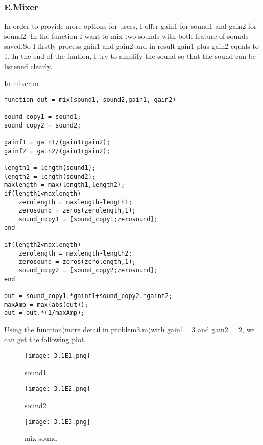 \documentclass{article}
\begin{document}
\subsubsection*{E.Mixer}
In order to provide more options for users,
I offer gain1 for sound1 and gain2 for sound2.
In the function I want to mix two sounds with 
both feature of sounds saved.So I firstly process 
gain1 and gain2 and in result gain1 plus gain2 equals to 1. 
In the end of the funtion, I try to amplify the sound 
so that the sound can be listened clearly.\par
In mixer.m\par
\begin{lstlisting} 
function out = mix(sound1, sound2,gain1, gain2)

sound_copy1 = sound1;
sound_copy2 = sound2;

gainf1 = gain1/(gain1+gain2);
gainf2 = gain2/(gain1+gain2);

length1 = length(sound1);
length2 = length(sound2);
maxlength = max(length1,length2);
if(length1<maxlength)
    zerolength = maxlength-length1;
    zerosound = zeros(zerolength,1);
    sound_copy1 = [sound_copy1;zerosound];
end

if(length2<maxlength)
    zerolength = maxlength-length2;
    zerosound = zeros(zerolength,1);
    sound_copy2 = [sound_copy2;zerosound];
end

out = sound_copy1.*gainf1+sound_copy2.*gainf2;
maxAmp = max(abs(out));
out = out.*(1/maxAmp);
\end{lstlisting}
\newpage
Using the function(more detail in problem3.m)with gain1 =3 and gain2 = 2,
we can get the following plot.\par
\begin{figure}[h]
    \begin{minipage}{1.0\textwidth}
        \centering
        \texttt{[image: 3.1E1.png]}
        \caption{sound1}
    \end{minipage}

    \quad

    \begin{minipage}{1.0\textwidth}
        \centering
        \texttt{[image: 3.1E2.png]}
        \caption{sound2}
    \end{minipage}

    \quad

    \begin{minipage}{1.0\textwidth}
        \centering
        \texttt{[image: 3.1E3.png]}
        \caption{mix sound}
    \end{minipage}
\end{figure}
\end{document}
